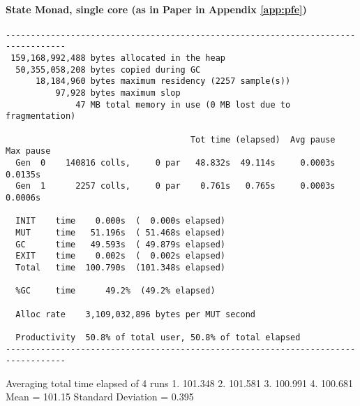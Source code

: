\paragraph{State Monad, single core (as in Paper in Appendix \ref{app:pfe})}
\begin{verbatim}
----------------------------------------------------------------------------------
 159,168,992,488 bytes allocated in the heap
  50,355,058,208 bytes copied during GC
      18,184,960 bytes maximum residency (2257 sample(s))
          97,928 bytes maximum slop
              47 MB total memory in use (0 MB lost due to fragmentation)

                                     Tot time (elapsed)  Avg pause  Max pause
  Gen  0    140816 colls,     0 par   48.832s  49.114s     0.0003s    0.0135s
  Gen  1      2257 colls,     0 par    0.761s   0.765s     0.0003s    0.0006s

  INIT    time    0.000s  (  0.000s elapsed)
  MUT     time   51.196s  ( 51.468s elapsed)
  GC      time   49.593s  ( 49.879s elapsed)
  EXIT    time    0.002s  (  0.002s elapsed)
  Total   time  100.790s  (101.348s elapsed)

  %GC     time      49.2%  (49.2% elapsed)

  Alloc rate    3,109,032,896 bytes per MUT second

  Productivity  50.8% of total user, 50.8% of total elapsed
----------------------------------------------------------------------------------
\end{verbatim}

Averaging total time elapsed of 4 runs 
1. 101.348
2. 101.581
3. 100.991
4. 100.681
Mean = 101.15
Standard Deviation = 0.395


